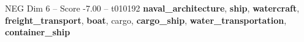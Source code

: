 \begin{textsample}{NEG Dim 6 – Score -7.00 – t010192}  \label{ex:f6_neg_023}
\textbf{naval\_architecture}, \textbf{ship}, \textbf{watercraft}, \textbf{freight\_transport}, \textbf{boat}, cargo, \textbf{cargo\_ship}, \textbf{water\_transportation}, \textbf{container\_ship}

\end{textsample}
